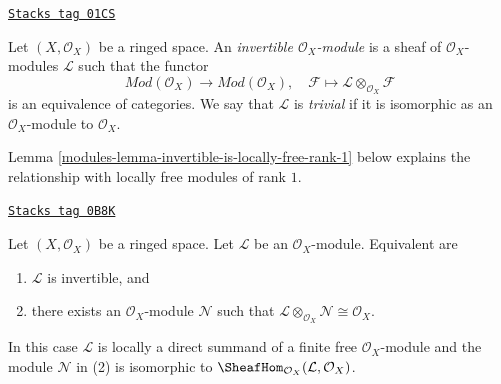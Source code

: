 \begin{definition}[Invertible]
\label{modules-definition-invertible}
\href{https://stacks.math.columbia.edu/tag/01CS}{\texttt{Stacks tag 01CS}}

Let $(X, \mathcal{O}_X)$ be a ringed space. An
{\it invertible $\mathcal{O}_X$-module} is a sheaf
of $\mathcal{O}_X$-modules $\mathcal{L}$ such that
the functor
$$
\textit{Mod}(\mathcal{O}_X) \longrightarrow \textit{Mod}(\mathcal{O}_X),\quad
\mathcal{F} \longmapsto \mathcal{L} \otimes_{\mathcal{O}_X} \mathcal{F}
$$
is an equivalence of categories. We say that $\mathcal{L}$ is
{\it trivial} if it is isomorphic as an $\mathcal{O}_X$-module
to $\mathcal{O}_X$.
\end{definition}

Lemma \ref{modules-lemma-invertible-is-locally-free-rank-1}
below explains the relationship with locally free modules
of rank $1$.

\begin{lemma}[Invertible]
\label{modules-lemma-invertible}
\href{https://stacks.math.columbia.edu/tag/0B8K}{\texttt{Stacks tag 0B8K}}

Let $(X, \mathcal{O}_X)$ be a ringed space. Let $\mathcal{L}$
be an $\mathcal{O}_X$-module. Equivalent are
\begin{enumerate}
\item $\mathcal{L}$ is invertible, and
\item there exists an $\mathcal{O}_X$-module $\mathcal{N}$
such that
$\mathcal{L} \otimes_{\mathcal{O}_X} \mathcal{N} \cong \mathcal{O}_X$.
\end{enumerate}
In this case $\mathcal{L}$ is locally a direct summand of a finite free
$\mathcal{O}_X$-module and the module $\mathcal{N}$ in (2) is isomorphic to
$\SheafHom_{\mathcal{O}_X}(\mathcal{L}, \mathcal{O}_X)$.
\end{lemma}

